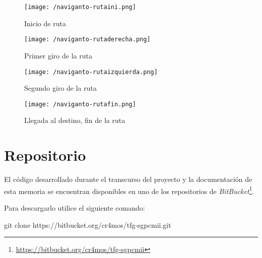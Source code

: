 \begin{figure}[!h]
  \begin{minipage}[b]{0.5\linewidth}
    \begin{center}
      \texttt{[image: /naviganto-rutaini.png]}
      \caption{Inicio de ruta}
      \label{fig:navigantoRutaIni}
    \end{center}
  \end{minipage}
  \begin{minipage}[b]{0.5\linewidth}
    \begin{center}
      \texttt{[image: /naviganto-rutaderecha.png]}
      \caption{Primer giro de la ruta}
      \label{fig:navigantoRutaPrimerGiro}
    \end{center}
  \end{minipage}
\end{figure}

\begin{figure}[!h]
  \begin{minipage}[b]{0.5\linewidth}
    \begin{center}
      \texttt{[image: /naviganto-rutaizquierda.png]}
      \caption{Segundo giro de la ruta}
      \label{fig:navigantoRutaSegundoGiro}
    \end{center}
  \end{minipage}
  \begin{minipage}[b]{0.5\linewidth}
    \begin{center}
      \texttt{[image: /naviganto-rutafin.png]}
      \caption{Llegada al destino, fin de la ruta}
      \label{fig:navigantoRutaFin}
    \end{center}
  \end{minipage}
\end{figure}

\section{Repositorio}

El código desarrollado durante el transcurso del proyecto y la documentación de esta memoria se
encuentran disponibles en uno de los repositorios de 
\emph{BitBucket}\footnote{\url{https://bitbucket.org/cr4mos/tfg-sgpcmii}}.

Para descargarlo utilice el siguiente comando:

\begin{listing}[
  float=ht,
  language = Bash]
git clone https://bitbucket.org/cr4mos/tfg-sgpcmii.git
\end{listing}

